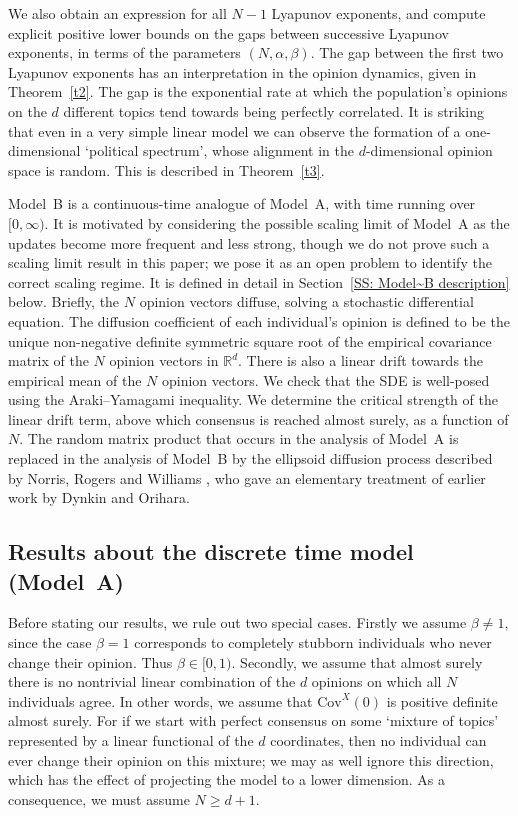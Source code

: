 \documentclass[12pt]{article}
\newcommand{\Cov}{\mathrm{Cov}}
\newcommand{\1}{\mathbf{1}}
\begin{document}
We also obtain an expression for all $N-1$ Lyapunov exponents, and compute explicit positive lower bounds on the gaps between successive Lyapunov exponents, in terms of the parameters $(N, \alpha, \beta)$.  The gap between the first two Lyapunov exponents has an interpretation in the opinion dynamics, given in Theorem~\ref{t2}. The gap is the exponential rate at which the population's opinions on the $d$ different topics tend towards being perfectly correlated. It is striking that even in a very simple linear model we can observe the formation of a one-dimensional `political spectrum', whose alignment in the $d$-dimensional opinion space is random. This is described in Theorem~\ref{t3}. 


Model~B is a continuous-time analogue of Model~A, with time running over $[0,\infty)$. {It is motivated by considering the possible scaling limit of Model~A as the updates become more frequent and less strong, though we do not prove such a scaling limit result in this paper; we pose it as an open problem to identify the correct scaling regime.} 
%
It is defined in detail in Section~\ref{SS: Model~B description} below. Briefly, the $N$ opinion vectors diffuse, solving a stochastic differential equation. The diffusion coefficient of each individual's opinion is defined to be the unique non-negative definite symmetric square root of the empirical covariance matrix of the $N$ opinion vectors in $\mathbb{R}^d$. There is also a linear drift towards the empirical mean of the $N$ opinion vectors. We check that the SDE is well-posed using the Araki--Yamagami inequality. We determine the critical strength of the linear drift term, above which consensus is reached almost surely, as a function of $N$.  The random matrix product that occurs in the analysis of Model~A is replaced in the analysis of Model~B by the ellipsoid diffusion process described by Norris, Rogers and Williams \cite{NRW}, who gave an elementary treatment of earlier work by Dynkin and Orihara.  


\subsection{Results about the discrete time model (Model~A)}\label{SS: results about Model~A}




Before stating our results, we rule out two special cases. Firstly we assume $\beta \neq 1$, since the case $\beta = 1$ corresponds to completely stubborn individuals who never change their opinion. Thus $\beta \in [0,1)$. Secondly, we assume that almost surely there is no nontrivial linear combination of the $d$ opinions on which all $N$ individuals agree. In other words, we assume that $\Cov^X(0)$ is positive definite almost surely. For if we start with perfect consensus on some `mixture of topics' represented by a linear functional of the $d$ coordinates, then no individual can ever change their opinion on this mixture; we may as well ignore this direction, which has the effect of projecting the model to a lower dimension.  As a consequence, we must assume $N \ge d+1$.
\end{document}
